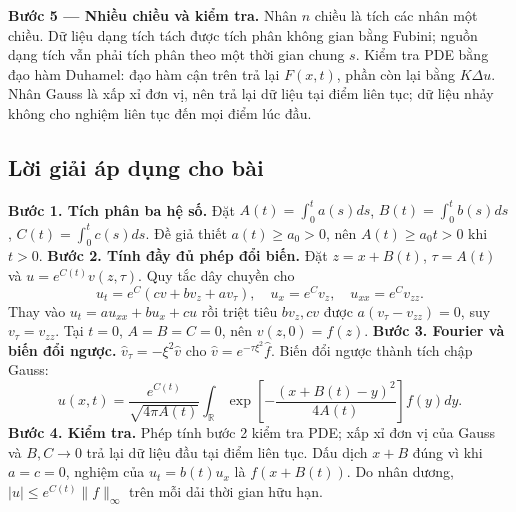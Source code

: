 \documentclass[10pt,a4paper]{article}
\begin{document}
\textbf{Bước 5 — Nhiều chiều và kiểm tra.} Nhân $n$ chiều là tích các nhân một chiều. Dữ liệu dạng tích tách được tích phân không gian bằng Fubini; nguồn dạng tích vẫn phải tích phân theo một thời gian chung $s$. Kiểm tra PDE bằng đạo hàm Duhamel: đạo hàm cận trên trả lại $F(x,t)$, phần còn lại bằng $K\Delta u$. Nhân Gauss là xấp xỉ đơn vị, nên trả lại dữ liệu tại điểm liên tục; dữ liệu nhảy không cho nghiệm liên tục đến mọi điểm lúc đầu.
\subsection*{Lời giải áp dụng cho bài}
\textbf{Bước 1. Tích phân ba hệ số.}
Đặt $A(t)=\int_0^ta(s)ds$, $B(t)=\int_0^tb(s)ds$, $C(t)=\int_0^tc(s)ds$. Đề giả thiết $a(t)\ge a_0>0$, nên $A(t)\ge a_0t>0$ khi $t>0$.
\textbf{Bước 2. Tính đầy đủ phép đổi biến.}
Đặt $z=x+B(t)$, $\tau=A(t)$ và $u=e^{C(t)}v(z,\tau)$. Quy tắc dây chuyền cho
\[u_t=e^C(cv+bv_z+av_\tau),\quad
u_x=e^Cv_z,\quad u_{xx}=e^Cv_{zz}.\]
Thay vào $u_t=au_{xx}+bu_x+cu$ rồi triệt tiêu $bv_z,cv$ được $a(v_\tau-v_{zz})=0$, suy $v_\tau=v_{zz}$. Tại $t=0$, $A=B=C=0$, nên $v(z,0)=f(z)$.
\textbf{Bước 3. Fourier và biến đổi ngược.}
$\widehat v_\tau=-\xi^2\widehat v$ cho $\widehat v=e^{-\tau\xi^2}\widehat f$. Biến đổi ngược thành tích chập Gauss:
\[u(x,t)=\frac{e^{C(t)}}{\sqrt{4\pi A(t)}}\int_{\mathbb R}
\exp\left[-\frac{(x+B(t)-y)^2}{4A(t)}\right]f(y)dy.\]
\textbf{Bước 4. Kiểm tra.}
Phép tính bước 2 kiểm tra PDE; xấp xỉ đơn vị của Gauss và $B,C\to0$ trả lại dữ liệu đầu tại điểm liên tục. Dấu dịch $x+B$ đúng vì khi $a=c=0$, nghiệm của $u_t=b(t)u_x$ là $f(x+B(t))$. Do nhân dương, $|u|\le e^{C(t)}\|f\|_\infty$ trên mỗi dải thời gian hữu hạn.
\end{document}

